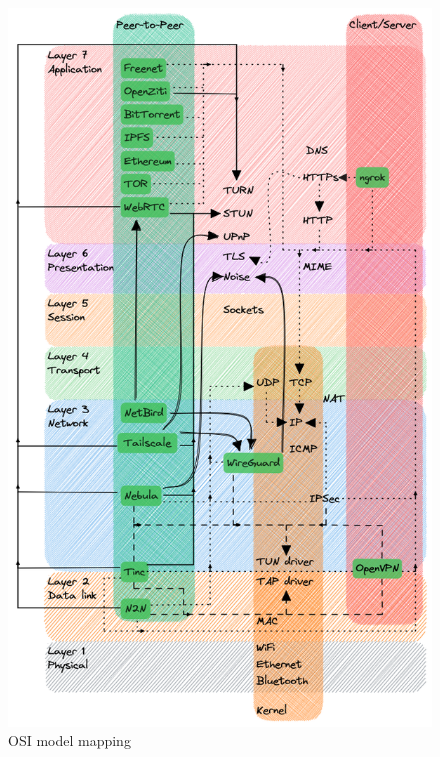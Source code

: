 \begin{figure}
\centering
\includegraphics[width=\textwidth,height=0.9\textheight]{notes/../figures/osi-map.excalidraw.png}
\caption{OSI model mapping}
\end{figure}

\newpage

